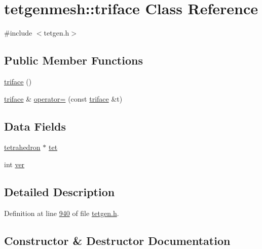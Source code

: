\hypertarget{classtetgenmesh_1_1triface}{}\section{tetgenmesh\+:\+:triface Class Reference}
\label{classtetgenmesh_1_1triface}


{\ttfamily \#include $<$tetgen.\+h$>$}

\subsection*{Public Member Functions}
\begin{DoxyCompactItemize}
\item 
\hyperlink{classtetgenmesh_1_1triface_a07f411d8a45e86fe71b9f996cb042d63}{triface} ()
\item 
\hyperlink{classtetgenmesh_1_1triface}{triface} \& \hyperlink{classtetgenmesh_1_1triface_aeb0b1b77a12ca18599472e01ae8fe119}{operator=} (const \hyperlink{classtetgenmesh_1_1triface}{triface} \&t)
\end{DoxyCompactItemize}
\subsection*{Data Fields}
\begin{DoxyCompactItemize}
\item 
\hyperlink{classtetgenmesh_a6a12b1c0d1834ca941d16c62e949e5e3}{tetrahedron} $\ast$ \hyperlink{classtetgenmesh_1_1triface_ad3b174c4040b18a5286ddfeb8db02529}{tet}
\item 
int \hyperlink{classtetgenmesh_1_1triface_a2b2b1dc34da73125359d6db535d75f7c}{ver}
\end{DoxyCompactItemize}


\subsection{Detailed Description}


Definition at line \hyperlink{tetgen_8h_source_l00940}{940} of file \hyperlink{tetgen_8h_source}{tetgen.\+h}.



\subsection{Constructor \& Destructor Documentation}
